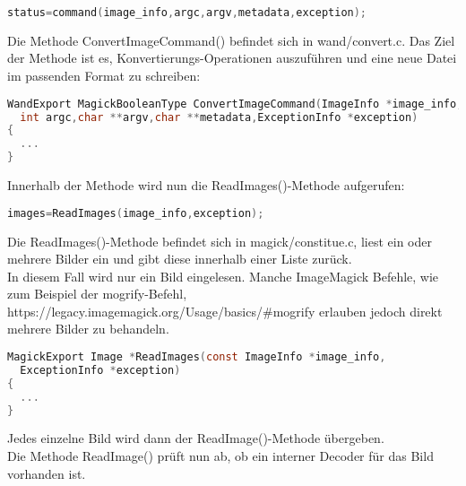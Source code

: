 \begin{lstlisting}[firstnumber=172, language=C, caption=wand/migrify.c Aufruf des ConvertImageCommand,label={lst:lstlisting}]
status=command(image_info,argc,argv,metadata,exception);
\end{lstlisting}
\vspace{5mm}


Die Methode ConvertImageCommand() befindet sich in wand/convert.c. Das Ziel der Methode ist es, Konvertierungs-Operationen auszuführen und eine neue Datei im passenden Format zu schreiben:\\

\begin{lstlisting}[firstnumber=498, language=C, caption=wand/convert.c ConvertImageCommand(),label={lst:lstlisting}]
WandExport MagickBooleanType ConvertImageCommand(ImageInfo *image_info,
  int argc,char **argv,char **metadata,ExceptionInfo *exception)
{
  ...
}
\end{lstlisting}
\vspace{5mm}

Innerhalb der Methode wird nun die ReadImages()-Methode aufgerufen:

\begin{lstlisting}[firstnumber=628, language=C, caption=wand/convert.c Aufruf ReadImages(),label={lst:lstlisting}]
  images=ReadImages(image_info,exception);
\end{lstlisting}
\vspace{5mm}

Die ReadImages()-Methode befindet sich in magick/constitue.c, liest ein oder mehrere Bilder ein und gibt diese innerhalb einer Liste zurück.\\
In diesem Fall wird nur ein Bild eingelesen.
Manche ImageMagick Befehle, wie zum Beispiel der mogrify-Befehl, https://legacy.imagemagick.org/Usage/basics/#mogrify erlauben jedoch direkt mehrere Bilder zu behandeln.\\

\begin{lstlisting}[firstnumber=790, language=C, caption=magick/constitute.c ReadImages(),label={lst:lstlisting}]
MagickExport Image *ReadImages(const ImageInfo *image_info,
  ExceptionInfo *exception)
{
  ...
}
\end{lstlisting}
\vspace{5mm}

Jedes einzelne Bild wird dann der ReadImage()-Methode übergeben.\\

Die Methode ReadImage() prüft nun ab, ob ein interner Decoder für das Bild vorhanden ist.

